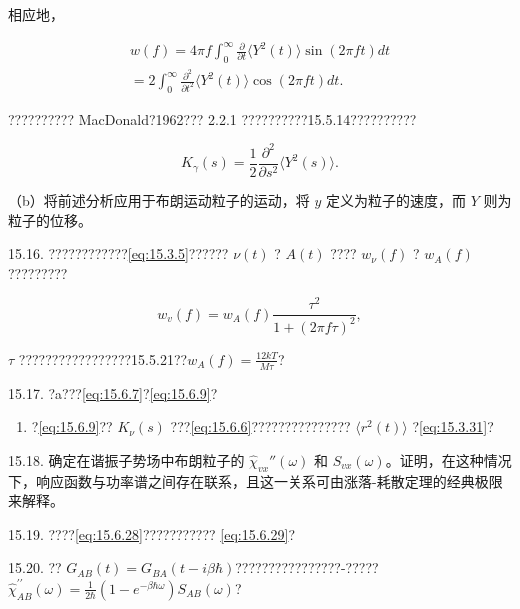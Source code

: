 相应地，

\begin{equation}\tag{15.6.77}\label{eq:15.6.77}
\begin{array}{r} { w ( f ) = 4 \pi f \int _ { 0 } ^{\infty} \frac { \partial } { \partial t } \langle Y ^{2} ( t ) \rangle \sin ( 2 \pi f t ) d t } \\{ = 2 \int _ { 0 } ^{\infty} \frac { \partial ^{2} } { \partial t ^{2} } \langle Y ^{2} ( t ) \rangle \cos ( 2 \pi f t ) d t . } \end{array}
\end{equation}

?????????? MacDonald?1962??? 2.2.1 ??????????15.5.14??????????

\begin{equation}\tag{15.6.78}\label{eq:15.6.78}
K _ { \gamma } ( s ) = \frac { 1 } { 2 } \frac { \partial ^{2} } { \partial s ^{2} } \langle Y ^{2} ( s ) \rangle .
\end{equation}

（b）将前述分析应用于布朗运动粒子的运动，将 \(y\) 定义为粒子的速度，而 \(Y\) 则为粒子的位移。

15.16. ????????????\autoref{eq:15.3.5}?????? \(\nu(t)\) ? \(A(t)\) ???? \(w_{\nu}(f)\) ? \(w_{A}(f)\) ?????????

\begin{equation}\tag{15.6.79}\label{eq:15.6.79}
w _ { v } ( f ) = w _ { A } ( f ) \frac { \tau ^{2} } { 1 + ( 2 \pi f \tau ) ^{2} } ,
\end{equation}

\(\tau\) ?????????????????15.5.21??\(w_{A}(f) = \frac{12kT}{M\tau}\)?

15.17. ?a???\autoref{eq:15.6.7}?\autoref{eq:15.6.9}?

\begin{enumerate}
\def\labelenumi{(\alph{enumi})}
\setcounter{enumi}{1}
\tightlist
\item
?\autoref{eq:15.6.9}?? \(K_{\nu}(s)\) ???\autoref{eq:15.6.6}??????????????? \(\langle r^{2}(t)\rangle\) ?\autoref{eq:15.3.31}?
\end{enumerate}

15.18. 确定在谐振子势场中布朗粒子的 \(\hat{\chi}_{vx}''(\omega)\) 和 \(S_{vx}(\omega)\)。证明，在这种情况下，响应函数与功率谱之间存在联系，且这一关系可由涨落-耗散定理的经典极限来解释。

15.19. ????\autoref{eq:15.6.28}??????????? \autoref{eq:15.6.29}?

15.20. ?? \(G_{AB}(t) = G_{BA}(t - i\beta\hbar)\)????????????????-?????\(\hat{\chi}_{AB}^{\prime\prime}(\omega) = \frac{1}{2\hbar} \left(1 - e^{-\beta\hbar\omega}\right)S_{AB}(\omega)\)?

